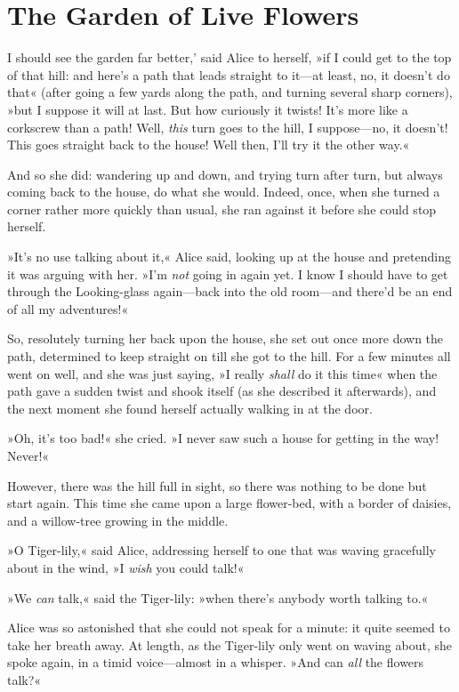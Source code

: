 \chapter{The Garden of Live Flowers}

\lettrine[lines=4,ante=`]{I}{} should see the garden far better,' said Alice to herself, »if I could get to the top of that hill: and here's a path that leads straight to it—at least, no, it doesn't do that\longdash« (after going a few yards along the path, and turning several sharp corners), »but I suppose it will at last. But how curiously it twists! It's more like a corkscrew than a path! Well, \textit{this} turn goes to the hill, I suppose—no, it doesn't! This goes straight back to the house! Well then, I'll try it the other way.«

And so she did: wandering up and down, and trying turn after turn, but always coming back to the house, do what she would. Indeed, once, when she turned a corner rather more quickly than usual, she ran against it before she could stop herself.

»It's no use talking about it,« Alice said, looking up at the house and pretending it was arguing with her. »I'm \textit{not} going in again yet. I know I should have to get through the Looking-glass again—back into the old room—and there'd be an end of all my adventures!«

So, resolutely turning her back upon the house, she set out once more down the path, determined to keep straight on till she got to the hill. For a few minutes all went on well, and she was just saying, »I really \textit{shall} do it this time\longdash« when the path gave a sudden twist and shook itself (as she described it afterwards), and the next moment she found herself actually walking in at the door.

»Oh, it's too bad!« she cried. »I never saw such a house for getting in the way! Never!«

However, there was the hill full in sight, so there was nothing to be done but start again. This time she came upon a large flower-bed, with a border of daisies, and a willow-tree growing in the middle.

»O Tiger-lily,« said Alice, addressing herself to one that was waving gracefully about in the wind, »I \textit{wish} you could talk!«

»We \textit{can} talk,« said the Tiger-lily: »when there's anybody worth talking to.«

Alice was so astonished that she could not speak for a minute: it quite seemed to take her breath away. At length, as the Tiger-lily only went on waving about, she spoke again, in a timid voice—almost in a whisper. »And can \textit{all} the flowers talk?«

